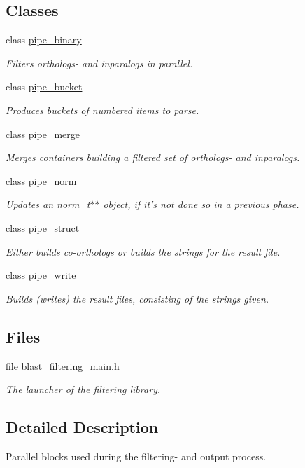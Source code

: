 \subsection*{Classes}
\begin{DoxyCompactItemize}
\item 
class \hyperlink{classpipe__binary}{pipe\_\-binary}
\begin{DoxyCompactList}\small\item\em Filters orthologs-\/ and inparalogs in parallel. \end{DoxyCompactList}\item 
class \hyperlink{classpipe__bucket}{pipe\_\-bucket}
\begin{DoxyCompactList}\small\item\em Produces buckets of numbered items to parse. \end{DoxyCompactList}\item 
class \hyperlink{classpipe__merge}{pipe\_\-merge}
\begin{DoxyCompactList}\small\item\em Merges containers building a filtered set of orthologs-\/ and inparalogs. \end{DoxyCompactList}\item 
class \hyperlink{classpipe__norm}{pipe\_\-norm}
\begin{DoxyCompactList}\small\item\em Updates an norm\_\-t$\ast$$\ast$ object, if it's not done so in a previous phase. \end{DoxyCompactList}\item 
class \hyperlink{classpipe__struct}{pipe\_\-struct}
\begin{DoxyCompactList}\small\item\em Either builds co-\/orthologs or builds the strings for the result file. \end{DoxyCompactList}\item 
class \hyperlink{classpipe__write}{pipe\_\-write}
\begin{DoxyCompactList}\small\item\em Builds (writes) the result files, consisting of the strings given. \end{DoxyCompactList}\end{DoxyCompactItemize}
\subsection*{Files}
\begin{DoxyCompactItemize}
\item 
file \hyperlink{blast__filtering__main_8h}{blast\_\-filtering\_\-main.h}


\begin{DoxyCompactList}\small\item\em The launcher of the filtering library. \end{DoxyCompactList}

\end{DoxyCompactItemize}


\subsection{Detailed Description}
Parallel blocks used during the filtering-\/ and output process. 